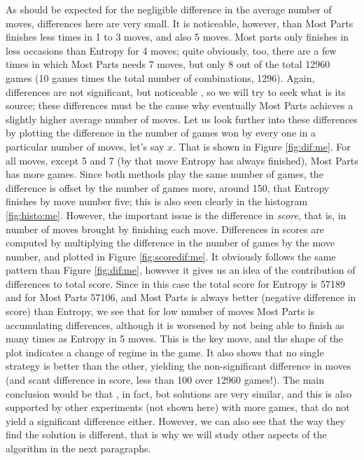 \documentclass[preprint,12pt]{elsarticle}
\begin{document}
As should be expected for the negligible difference in the average number of moves, differences here
are very small. It is noticeable, however, than Most Parts finishes
less times in 1 to 3 moves, and also 5 moves. Most parts only finishes
in less occasions than Entropy for 4 moves; quite obviously, too,
there are a few times in which Most Parts needs 7 moves, but only
8 out of the total 12960 games (10 games times the total number of
combinations, 1296). Again, differences are not significant, 
but noticeable , so we will try to seek what is its source;
these differences must be the cause why eventually Most Parts achieves
a slightly higher average number of moves. Let us look further into
these differences by plotting the difference in the number of games
won by every one in a particular number of moves, let's say $x$. That
is shown in Figure \ref{fig:dif:me}. For all moves, except 5 and 7 (by
that move Entropy has always finished), Most Parts has more
games. Since both methods play the same number of games, the
difference is offset by the number of games more, around 150, that
Entropy finishes by move number five; this is also seen clearly in the
histogram \ref{fig:histo:me}. However, the important issue is the
difference in {\em score}, that is, in number of moves brought by
finishing each move. Differences in scores are computed by multiplying
the difference in the number of games by the move number, and plotted
in Figure \ref{fig:scoredif:me}. It obviously follows the same pattern
than Figure \ref{fig:dif:me}, however it gives us an idea of the
contribution of differences to total score. Since in this case the
total score for Entropy is 57189 and for Most Parts 57106, and Most
Parts is always better (negative difference in score) than Entropy, we
see that for low number of moves Most Parts is accumulating
differences, although it is worsened by not being able to finish as
many times as Entropy in 5 moves. This is the key move, and the shape
of the plot indicates a change of regime in the game. It also shows
that no single strategy is better than the other, yielding the
non-significant difference in moves (and scant difference in score,
less than 100 over 12960 games!). The main conclusion would be that ,
in fact, bot solutions are very similar, and this is also supported by
other experiments (not shown here) with more games, that do not yield
a significant difference either. However, we can also see that the way
they find the solution is different, that is why we will study other
aspects of the algorithm in the next paragraphs. 
\end{document}
